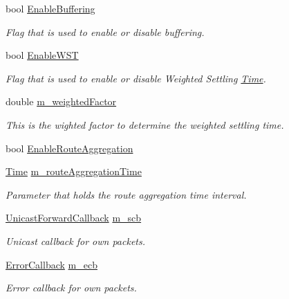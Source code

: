 \begin{DoxyCompactItemize}
bool \hyperlink{classns3_1_1dsdv_1_1RoutingProtocol_a257bf2eb6e7eff700d12f00f2d9ec0e3}{Enable\+Buffering}
\begin{DoxyCompactList}\small\item\em Flag that is used to enable or disable buffering. \end{DoxyCompactList}\item 
bool \hyperlink{classns3_1_1dsdv_1_1RoutingProtocol_abf3b9f8c78278e4d2faf177146359d19}{Enable\+W\+ST}
\begin{DoxyCompactList}\small\item\em Flag that is used to enable or disable Weighted Settling \hyperlink{classns3_1_1Time}{Time}. \end{DoxyCompactList}\item 
double \hyperlink{classns3_1_1dsdv_1_1RoutingProtocol_afd15e37062d937b28ba081fc515f3a77}{m\+\_\+weighted\+Factor}
\begin{DoxyCompactList}\small\item\em This is the wighted factor to determine the weighted settling time. \end{DoxyCompactList}\item 
bool \hyperlink{classns3_1_1dsdv_1_1RoutingProtocol_a91fada0798359d72bfaf88bf33b1e62d}{Enable\+Route\+Aggregation}
\item 
\hyperlink{classns3_1_1Time}{Time} \hyperlink{classns3_1_1dsdv_1_1RoutingProtocol_a8d7bef939cd3872c1821fc4bce884f8d}{m\+\_\+route\+Aggregation\+Time}
\begin{DoxyCompactList}\small\item\em Parameter that holds the route aggregation time interval. \end{DoxyCompactList}\item 
\hyperlink{classns3_1_1Ipv4RoutingProtocol_a3453a85764cbbb1e704da7e919aa5d19}{Unicast\+Forward\+Callback} \hyperlink{classns3_1_1dsdv_1_1RoutingProtocol_a2ffc78a04da837daca7d5012373ef905}{m\+\_\+scb}
\begin{DoxyCompactList}\small\item\em Unicast callback for own packets. \end{DoxyCompactList}\item 
\hyperlink{classns3_1_1Ipv4RoutingProtocol_a0348285418c30d5021b08f7a68af21ea}{Error\+Callback} \hyperlink{classns3_1_1dsdv_1_1RoutingProtocol_a99588cc0468d174969bd6a66670286ee}{m\+\_\+ecb}
\begin{DoxyCompactList}\small\item\em Error callback for own packets. \end{DoxyCompactList}\item 

\end{DoxyCompactItemize}
